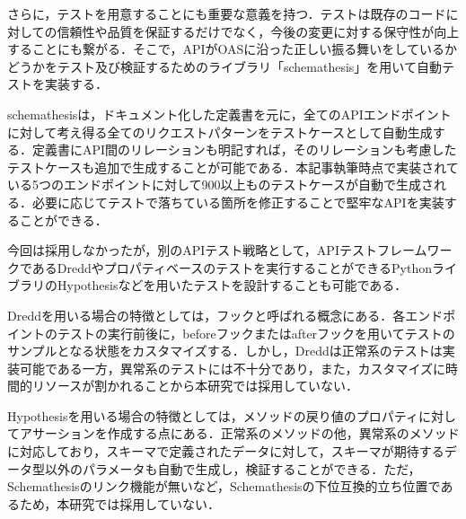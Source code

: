           \par さらに，テストを用意することにも重要な意義を持つ．テストは既存のコードに対しての信頼性や品質を保証するだけでなく，今後の変更に対する保守性が向上することにも繋がる．そこで，APIがOASに沿った正しい振る舞いをしているかどうかをテスト及び検証するためのライブラリ「schemathesis」を用いて自動テストを実装する．
          \par schemathesisは，ドキュメント化した定義書を元に，全てのAPIエンドポイントに対して考え得る全てのリクエストパターンをテストケースとして自動生成する．定義書にAPI間のリレーションも明記すれば，そのリレーションも考慮したテストケースも追加で生成することが可能である．本記事執筆時点で実装されている5つのエンドポイントに対して900以上ものテストケースが自動で生成される．必要に応じてテストで落ちている箇所を修正することで堅牢なAPIを実装することができる．
          \par 今回は採用しなかったが，別のAPIテスト戦略として，APIテストフレームワークであるDreddやプロパティベースのテストを実行することができるPythonライブラリのHypothesisなどを用いたテストを設計することも可能である．
          \par Dreddを用いる場合の特徴としては，フックと呼ばれる概念にある．各エンドポイントのテストの実行前後に，beforeフックまたはafterフックを用いてテストのサンプルとなる状態をカスタマイズする．しかし，Dreddは正常系のテストは実装可能である一方，異常系のテストには不十分であり，また，カスタマイズに時間的リソースが割かれることから本研究では採用していない．
          \par Hypothesisを用いる場合の特徴としては，メソッドの戻り値のプロパティに対してアサーションを作成する点にある．正常系のメソッドの他，異常系のメソッドに対応しており，スキーマで定義されたデータに対して，スキーマが期待するデータ型以外のパラメータも自動で生成し，検証することができる．ただ，Schemathesisのリンク機能が無いなど，Schemathesisの下位互換的立ち位置であるため，本研究では採用していない．
      
